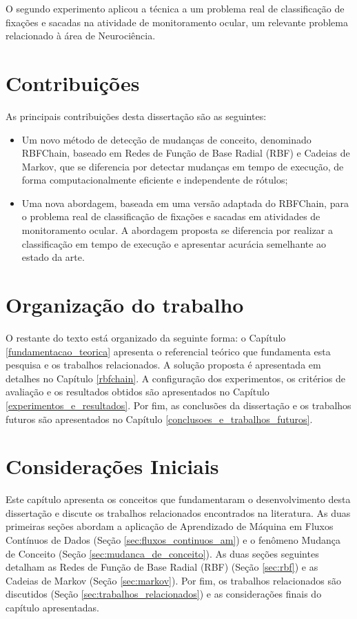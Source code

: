 \documentclass[msc, classic, a4paper]{ufbathesis}
\begin{document}
O segundo experimento aplicou a técnica a um problema real de classificação de fixações e sacadas na atividade de monitoramento ocular, um relevante problema relacionado à área de Neurociência.

\section{Contribuições}

As principais contribuições desta dissertação são as seguintes:

\begin{itemize}
    \item Um novo método de detecção de mudanças de conceito, denominado RBFChain, baseado em Redes de Função de Base Radial (RBF) e Cadeias de Markov, que se diferencia por detectar mudanças em tempo de execução, de forma computacionalmente eficiente e independente de rótulos;
    \item Uma nova abordagem, baseada em uma versão adaptada do RBFChain, para o problema real de classificação de fixações e sacadas em atividades de monitoramento ocular.
    A abordagem proposta se diferencia por realizar a classificação em tempo de execução e apresentar acurácia semelhante ao estado da arte.
\end{itemize}

\section{Organização do trabalho}

O restante do texto está organizado da seguinte forma:
%
o Capítulo \ref{fundamentacao_teorica} apresenta o referencial teórico que fundamenta esta pesquisa e os trabalhos relacionados.
A solução proposta é apresentada em detalhes no Capítulo \ref{rbfchain}.
A configuração dos experimentos, os critérios de avaliação e os resultados obtidos são apresentados no Capítulo \ref{experimentos_e_resultados}.
Por fim, as conclusões da dissertação e os trabalhos futuros são apresentados no Capítulo \ref{conclusoes_e_trabalhos_futuros}.

 \label{fundamentacao_teorica}
\section{Considerações Iniciais}

Este capítulo apresenta os conceitos que fundamentaram o desenvolvimento desta dissertação e discute os trabalhos relacionados encontrados na literatura.
As duas primeiras seções abordam a aplicação de Aprendizado de Máquina em Fluxos Contínuos de Dados (Seção \ref{sec:fluxos_continuos_am}) e o fenômeno Mudança de Conceito (Seção \ref{sec:mudanca_de_conceito}).
As duas seções seguintes detalham as Redes de Função de Base Radial (RBF) (Seção \ref{sec:rbf}) e as Cadeias de Markov (Seção \ref{sec:markov}).
Por fim, os trabalhos relacionados são discutidos (Seção \ref{sec:trabalhos_relacionados}) e as considerações finais do capítulo apresentadas.
\end{document}
